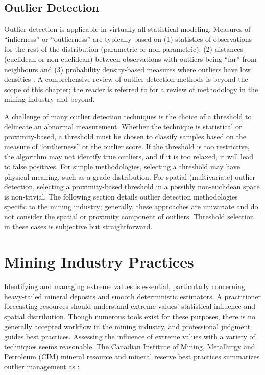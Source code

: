 \FloatBarrier
\subsection{Outlier Detection}
\label{subsec:02dectection}

Outlier detection is applicable in virtually all statistical modeling. Measures of ``inlierness'' or ``outlierness'' are typically based on (1) statistics of observations for the rest of the distribution (parametric or non-parametric); (2) distances (euclidean or non-euclidean) between observations with outliers being ``far'' from neighbours and (3) probability density-based measures where outliers have low densities \citep{li2022ecod}. A comprehensive review of outlier detection methods is beyond the scope of this chapter; the reader is referred to \cite{aggarwal2016outlier,pang2022deep,hodge2004survey,wang2019progress,nowak2019optimal,leuangthong2015dealing} for a review of methodology in the mining industry and beyond.

A challenge of many outlier detection techniques is the choice of a threshold to delineate an abnormal measurement. Whether the technique is statistical or proximity-based, a threshold must be chosen to classify samples based on the measure of ``outlierness'' or the outlier score. If the threshold is too restrictive, the algorithm may not identify true outliers, and if it is too relaxed, it will lead to false positives. For simple methodologies, selecting a threshold may have physical meaning, such as a grade distribution. For spatial (multivariate) outlier detection, selecting a proximity-based threshold in a possibly non-euclidean space is non-trivial. The following section details outlier detection methodologies specific to the mining industry; generally, these approaches are univariate and do not consider the spatial or proximity component of outliers. Threshold selection in these cases is subjective but straightforward.

\FloatBarrier
\section{Mining Industry Practices}
\label{sec:02industry}

Identifying and managing extreme values is essential, particularly concerning heavy-tailed mineral deposits and smooth deterministic estimators. A practitioner forecasting resources should understand extreme values' statistical influence and spatial distribution. Though numerous tools exist for these purposes, there is no generally accepted workflow in the mining industry, and professional judgment guides best practices. Assessing the influence of extreme values with a variety of techniques seems reasonable. The Canadian Institute of Mining, Metallurgy and Petroleum (CIM) mineral resource and mineral reserve best practices summarizes outlier management as \citep{cim2019}:

